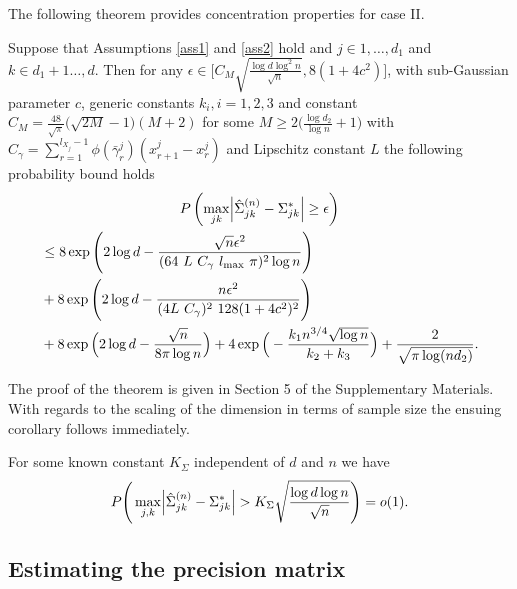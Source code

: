 \noindent The following theorem provides concentration properties for case II. 
\begin{theorem}\label{concentration_caseII}
    Suppose that Assumptions \ref{ass1} and \ref{ass2} hold and $j \in 1, \dots, d_1$ and $k \in d_1+1 \dots, d$. Then for any $\epsilon \in \Big[C_M\sqrt{\frac{\log d \log^2 n}{\sqrt{n}}},8(1+4c^2)\Big]$, with sub-Gaussian parameter $c$, generic constants $k_i, i = 1,2,3$ and constant $C_M = \frac{48}{\sqrt{\pi}} \big(\sqrt{2M} - 1\big)(M+2)$ for some $M \geq 2\big(\frac{\log d_2}{\log n} +1\big)$ with $C_\gamma = \sum_{r=1}^{l_{X_j}-1} \phi(\bar{\gamma}^j_r)(x^j_{r+1} - x^j_r)$ and Lipschitz constant $L$ the following probability bound holds     
    \begin{multline*}
        P\left(\max_{jk}\abs{\hat{\Sigma}_{jk}^{(n)} -  \Sigma_{jk}^{*}} \geq \epsilon \right) \\
        \begin{aligned}
        &\leq 8\exp\Bigg(2\log d - \frac{\sqrt{n}\epsilon^2}{(64 \ L \ C_\gamma \ l_{\max} \ \pi)^2 \log n}\Bigg) \\
        &+ 8\exp\left( 2\log d - \frac{n \epsilon^2}{(4L \ C_\gamma)^2 \ 128(1+4c^2)^2} \right) \\
        &+ 8\exp\Big(2\log d - \frac{\sqrt{n}}{8\pi\log n}\Big) + 4\exp\Big(- \frac{k_1 n^{3/4} \sqrt{\log n}}{k_2+ k_3} \Big) + \frac{2}{\sqrt{\pi \log(nd_2)}}.
        \end{aligned}
    \end{multline*}

\end{theorem}
The proof of the theorem is given in Section 5
of the Supplementary Materials. With regards to the scaling of the dimension in terms of sample size the ensuing corollary follows immediately.
\begin{corollary}
    For some known constant $K_{\Sigma}$ independent of $d$ and $n$ we have
    \begin{equation}
        P\Bigg(\max_{j,k}\abs{\hat{\Sigma}_{jk}^{(n)} - \Sigma_{jk}^*} > K_{\Sigma}\sqrt{\frac{\log d \log n}{\sqrt{n}}} \Bigg) = o(1).
    \end{equation}
\end{corollary}

\subsection{Estimating the precision matrix}\label{sec:precision_matrix}

